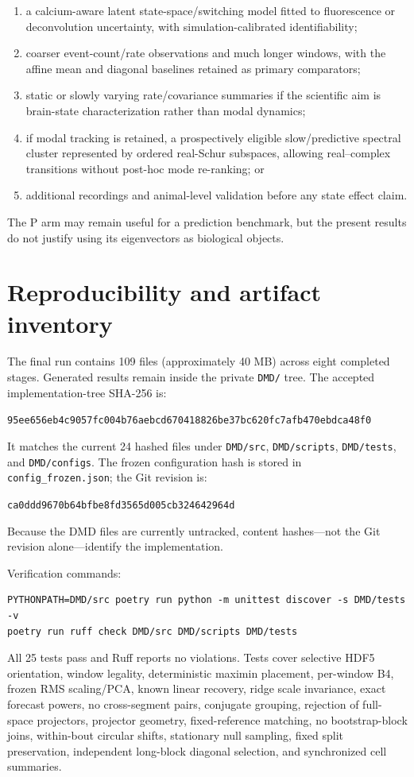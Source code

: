 \documentclass[11pt,a4paper]{article}
\begin{document}
\begin{enumerate}
  \item a calcium-aware latent state-space/switching model fitted to fluorescence
  or deconvolution uncertainty, with simulation-calibrated identifiability;
  \item coarser event-count/rate observations and much longer windows, with the
  affine mean and diagonal baselines retained as primary comparators;
  \item static or slowly varying rate/covariance summaries if the scientific aim
  is brain-state characterization rather than modal dynamics;
  \item if modal tracking is retained, a prospectively eligible slow/predictive
  spectral cluster represented by ordered real-Schur subspaces, allowing
  real--complex transitions without post-hoc mode re-ranking; or
  \item additional recordings and animal-level validation before any state
  effect claim.
\end{enumerate}

The P arm may remain useful for a prediction benchmark, but the present results
do not justify using its eigenvectors as biological objects.

\section{Reproducibility and artifact inventory}

The final run contains 109 files (approximately 40 MB) across eight completed
stages. Generated results remain inside the private \texttt{DMD/} tree. The
accepted implementation-tree SHA-256 is:
\begin{center}
\small\texttt{95ee656eb4c9057fc004b76aebcd670418826be37bc620fc7afb470ebdca48f0}
\end{center}
It matches the current 24 hashed files under \texttt{DMD/src},
\texttt{DMD/scripts}, \texttt{DMD/tests}, and \texttt{DMD/configs}. The frozen
configuration hash is stored in \texttt{config\_frozen.json}; the Git revision
is:
\begin{center}
\small\texttt{ca0ddd9670b64bfbe8fd3565d005cb324642964d}
\end{center}
Because the DMD files are currently untracked, content hashes---not the Git
revision alone---identify the implementation.

Verification commands:
\begin{verbatim}
PYTHONPATH=DMD/src poetry run python -m unittest discover -s DMD/tests -v
poetry run ruff check DMD/src DMD/scripts DMD/tests
\end{verbatim}
All 25 tests pass and Ruff reports no violations. Tests cover selective HDF5
orientation, window legality, deterministic maximin placement, per-window B4,
frozen RMS scaling/PCA, known linear recovery, ridge scale invariance, exact
forecast powers, no cross-segment pairs, conjugate grouping, rejection of
full-space projectors, projector geometry, fixed-reference matching, no
bootstrap-block joins, within-bout circular shifts, stationary null sampling,
fixed split preservation, independent long-block diagonal selection, and
synchronized cell summaries.
\end{document}
